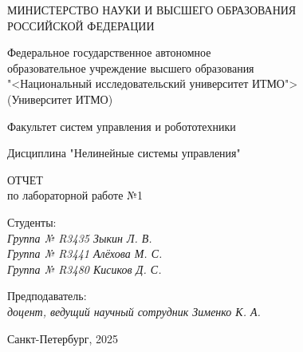 \thispagestyle{empty}

\begin{center}
    МИНИСТЕРСТВО НАУКИ И ВЫСШЕГО ОБРАЗОВАНИЯ \\ РОССИЙСКОЙ ФЕДЕРАЦИИ

    \vspace{20pt}

    Федеральное государственное автономное \\ образовательное учреждение высшего образования \\
    "<Национальный исследовательский университет ИТМО"> \\
    (Университет ИТМО)

    \vspace{20pt}

    Факультет систем управления и робототехники

    \vspace{20pt}

    Дисциплина "Нелинейные системы управления"
\end{center}

\vfill

\begin{center}
    ОТЧЕТ \\
    по лабораторной работе №1

    \vspace{20pt}

\end{center}

\vfill

    \noindent Студенты: \\
    \textit{Группа № R3435 \hfill Зыкин Л. В.} \\
    \textit{Группа № R3441 \hfill Алёхова М. С.} \\
    \textit{Группа № R3480 \hfill Кисиков Д. С.} \\

    \vspace{20pt}

    \noindent Предподаватель: \\
    \textit{доцент, ведущий научный сотрудник \hfill Зименко К. А.}

\vfill

\begin{center}
    Санкт-Петербург, 2025
\end{center}